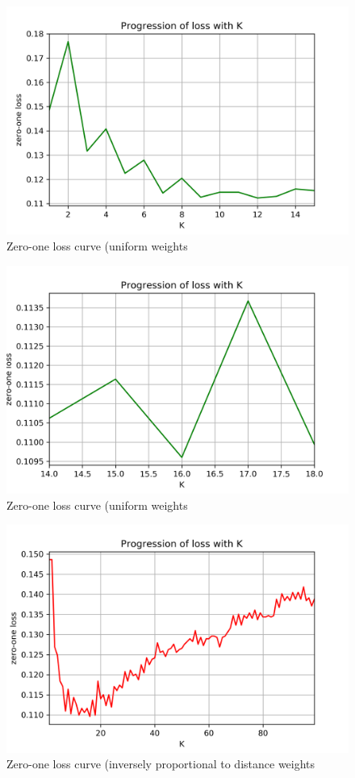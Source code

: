 \documentclass[a4paper]{article}
\begin{document}
\begin{figure}[H]
    \centering
    \includegraphics[width=12cm]{error_uniform_(mid_zoom)}
    \caption{Zero-one loss curve (uniform weights}
    \label{fig:ex2-b-error_uniform_1}
\end{figure}

\begin{figure}[H]
    \centering
    \includegraphics[width=12cm]{error_uniform_(full_zoom)}
    \caption{Zero-one loss curve (uniform weights}
    \label{fig:ex2-b-error_uniform_2}
\end{figure}

\begin{figure}[H]
    \centering
    \includegraphics[width=12cm]{error_distance}
    \caption{Zero-one loss curve (inversely proportional to distance weights}
    \label{fig:ex2-b-error_distance_0}
\end{figure}
\end{document}
